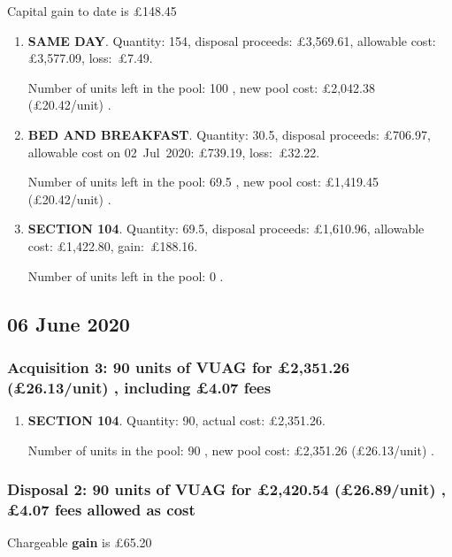 \documentclass{article}
\begin{document}
Capital gain to date is £148.45

\begin{enumerate}
\item \textbf{SAME DAY}. Quantity: 154,
    disposal proceeds: £3,569.61,
    allowable
    cost:
    £3,577.09,
    \mbox{loss: £7.49.}

    Number of units left in the pool:
    100%
,
    new pool cost: £2,042.38
    (£20.42/unit)%
.

\item \textbf{BED AND BREAKFAST}. Quantity: 30.5,
    disposal proceeds: £706.97,
    allowable
    cost on \mbox{02 Jul 2020:}
    £739.19,
    \mbox{loss: £32.22.}

    Number of units left in the pool:
    69.5%
,
    new pool cost: £1,419.45
    (£20.42/unit)%
.

\item \textbf{SECTION 104}. Quantity: 69.5,
    disposal proceeds: £1,610.96,
    allowable
    cost:
    £1,422.80,
    \mbox{gain: £188.16.}

    Number of units left in the pool:
    0%
.

\end{enumerate}



\subsection*{06 June 2020}
\subsubsection*{
    Acquisition 3: 90 units of VUAG for £2,351.26
    (£26.13/unit)%
    , including £4.07 fees
}

\begin{enumerate}
\item \textbf{SECTION 104}. Quantity: 90,
    actual cost: £2,351.26.

    Number of units in the pool:
    90%
,
    new pool cost: £2,351.26
    (£26.13/unit)%
.

\end{enumerate}

\subsubsection*{
    Disposal 2: 90 units of VUAG
for £2,420.54
    (£26.89/unit)%
    , £4.07 fees allowed as cost
}
Chargeable \textbf{gain} is £65.20
\end{document}
